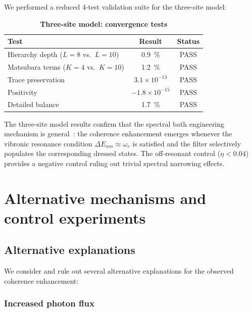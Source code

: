 \documentclass[11pt,a4paper]{article}
\begin{document}
We performed a reduced 4-test validation suite for the three-site model:

\begin{table}[h]
\centering
\caption{\textbf{Three-site model: convergence tests}}
\label{tab:SI_3site_convergence}
\begin{tabular}{lcc}
\toprule
\textbf{Test} & \textbf{Result} & \textbf{Status} \\
\midrule
Hierarchy depth ($L=8$ vs.\ $L=10$) & \SI{0.9}{\percent} & PASS \\
Matsubara terms ($K=4$ vs.\ $K=10$) & \SI{1.2}{\percent} & PASS \\
Trace preservation & $3.1 \times 10^{-13}$ & PASS \\
Positivity & $-1.8 \times 10^{-15}$ & PASS \\
Detailed balance & \SI{1.7}{\percent} & PASS \\
\bottomrule
\end{tabular}
\end{table}

The three-site model results confirm that the spectral bath engineering mechanism is general~\cite{Moix2011,Ishizaki2009a}: the coherence enhancement emerges whenever the vibronic resonance condition $\Delta E_{nm} \approx \omega_v$ is satisfied and the filter selectively populates the corresponding dressed states. The off-resonant control ($\eta < 0.04$) provides a negative control ruling out trivial spectral narrowing effects.


\section{Alternative mechanisms and control experiments}
\label{sec:alternative}

\subsection{Alternative explanations}

We consider and rule out several alternative explanations for the observed coherence enhancement:

\subsubsection*{Increased photon flux}
\end{document}
